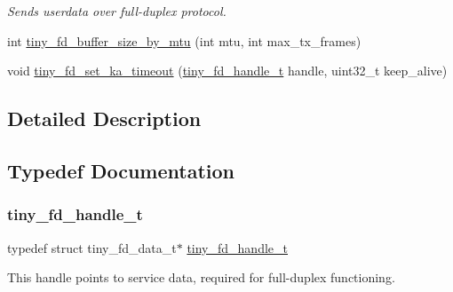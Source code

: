\begin{DoxyCompactItemize}
\begin{DoxyCompactList}\small\item\em Sends userdata over full-\/duplex protocol. \end{DoxyCompactList}\item 
int \hyperlink{group__FULL__DUPLEX__API_ga19789bea5b5acd68804773f0d6b0e3f7}{tiny\+\_\+fd\+\_\+buffer\+\_\+size\+\_\+by\+\_\+mtu} (int mtu, int max\+\_\+tx\+\_\+frames)
\item 
void \hyperlink{group__FULL__DUPLEX__API_gab86352107f707322e0ca15febf586cba}{tiny\+\_\+fd\+\_\+set\+\_\+ka\+\_\+timeout} (\hyperlink{group__FULL__DUPLEX__API_ga91e6b79431fe38570fb102701ef0b7e8}{tiny\+\_\+fd\+\_\+handle\+\_\+t} handle, uint32\+\_\+t keep\+\_\+alive)
\end{DoxyCompactItemize}


\subsection{Detailed Description}


\subsection{Typedef Documentation}
\mbox{\label{group__FULL__DUPLEX__API_ga91e6b79431fe38570fb102701ef0b7e8}} 
\subsubsection{\texorpdfstring{tiny\+\_\+fd\+\_\+handle\+\_\+t}{tiny\_fd\_handle\_t}}
{\footnotesize\ttfamily typedef struct tiny\+\_\+fd\+\_\+data\+\_\+t$\ast$ \hyperlink{group__FULL__DUPLEX__API_ga91e6b79431fe38570fb102701ef0b7e8}{tiny\+\_\+fd\+\_\+handle\+\_\+t}}

This handle points to service data, required for full-\/duplex functioning. \mbox{\label{group__FULL__DUPLEX__API_gad19ac27f4ba1d2b807e0a440b0c927d2}} 
